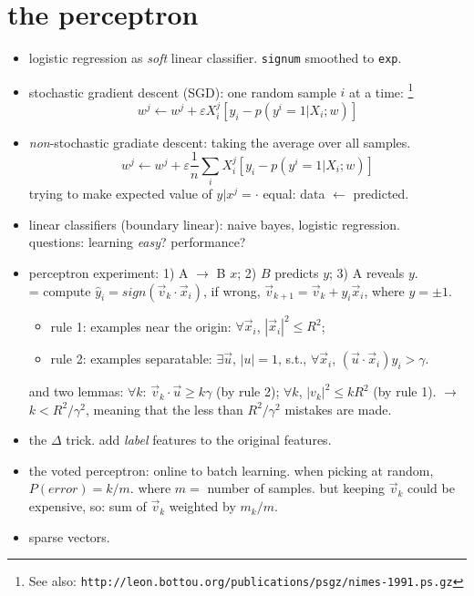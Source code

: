 \documentclass{article}
\begin{document}
\section{the perceptron}
\begin{itemize}
	\item logistic regression as \emph{soft} linear classifier. 
		{\tt signum} smoothed to {\tt exp}. 
	\item stochastic gradient descent (SGD): one random sample $i$ at a time: 
		\footnote{See also: \tt http://leon.bottou.org/publications/psgz/nimes-1991.ps.gz}
		\begin{equation}
			w^j\leftarrow w^j+\varepsilon X_i^j\left[y_i-p(y^i=1|X_i;w)\right]
		\end{equation}	
	\item {\it non}-stochastic gradiate descent: taking the average over all samples. 
		\begin{equation}
			w^j\leftarrow w^j+\varepsilon\frac1n\sum_iX_i^j\left[y_i-p(y^i=1|X_i;w)\right]
		\end{equation}
		trying to make expected value of $y|x^j=\cdot$ equal: data $\leftarrow$ predicted. 
	\item linear classifiers (boundary linear): naive bayes, logistic regression. \\
		questions: learning {\it easy}? performance?
	\item perceptron experiment: 1) A $\rightarrow$ B $x$; 2) $B$ predicts $y$; 3) A reveals $y$. \\
		= compute $\hat y_i=sign(\vec v_k\cdot\vec x_i)$,
		if wrong, $\vec v_{k+1}=\vec v_k+y_i\vec x_i$, where $y=\pm1$.
		\begin{itemize}
			\item rule 1: examples near the origin: $\forall\vec x_i$, $|\vec x_i|^2\le R^2$; 
			\item rule 2: examples separatable: $\exists\vec u$, $|u|=1$, s.t., $\forall\vec x_i$, 
				$(\vec u\cdot\vec x_i)y_i>\gamma$.
		\end{itemize}
		and two lemmas: $\forall k$: $\vec v_k\cdot\vec u\ge k\gamma$ (by rule 2);
			$\forall k$, $|v_k|^2\le kR^2$ (by rule 1). 
		$\rightarrow$ $k<R^2/\gamma^2$, meaning that the less than $R^2/\gamma^2$ mistakes are made.
	\item the $\Delta$ trick. add {\it label} features to the original features. 
	\item the voted perceptron: online to batch learning. when picking at random, 
		$P(error)=k/m$. where $m=$ number of samples. but keeping $\vec v_k$ could
		be expensive, so: sum of $\vec v_k$ weighted by $m_k/m$.
	\item sparse vectors. 	
\end{itemize}
\end{document}
